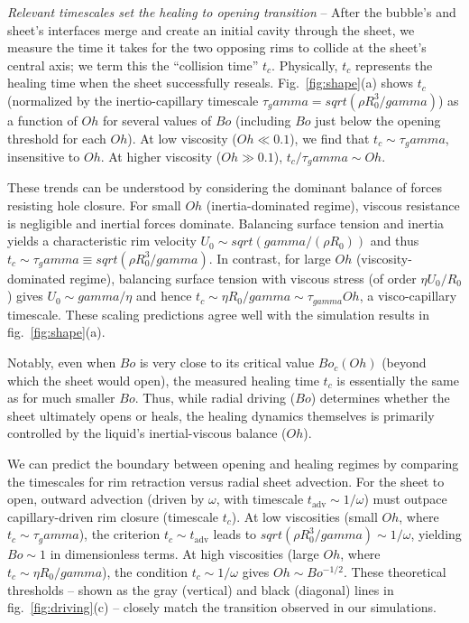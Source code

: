 \documentclass[reprint,amssymb,superscriptaddress,aps,prl,floatfix]{revtex4-2}
\def\gamma{gamma}%
\def\sqrt#1{sqrt(#1)}%
\begin{document}
{\it Relevant timescales set the healing to opening transition} -- 
After the bubble's and sheet's interfaces merge and create an initial cavity through the sheet, we
measure the time it takes for the two opposing rims to collide at the sheet's central
axis; we term this the ``collision time'' $t_c$. Physically, $t_c$ represents the healing
time when the sheet successfully reseals. Fig.~\ref{fig:shape}(a) shows $t_c$ (normalized
by the inertio-capillary timescale $\tau_\gamma = \sqrt{\rho R_0^3/\gamma}$) as a function
of $Oh$ for several values of $Bo$ (including $Bo$ just below the opening threshold for
each $Oh$). At low viscosity ($Oh \ll 0.1$), we find that $t_c \sim \tau_\gamma$,
insensitive to $Oh$. At higher viscosity ($Oh \gg 0.1$), $t_c/\tau_\gamma \sim Oh$.

These trends can be understood by considering the dominant balance of forces resisting
hole closure. For small $Oh$ (inertia-dominated regime), viscous resistance is negligible
and inertial forces dominate. Balancing surface tension and inertia yields a
characteristic rim velocity $U_0 \sim \sqrt{\gamma/(\rho R_0)}$ and thus $t_c \sim
\tau_\gamma \equiv \sqrt{\rho R_0^3/\gamma}$. In contrast, for large $Oh$
(viscosity-dominated regime), balancing surface tension with viscous stress (of order
$\eta U_0/R_0$) gives $U_0 \sim \gamma/\eta$ and hence $t_c \sim \eta R_0/\gamma \sim
\tau_{\gamma} Oh$, a visco-capillary timescale. These scaling predictions agree well with
the simulation results in fig.~\ref{fig:shape}(a).

Notably, even when $Bo$ is very close to its critical value $Bo_c(Oh)$ (beyond which the
sheet would open), the measured healing time $t_c$ is essentially the same as for much
smaller $Bo$. Thus, while radial driving ($Bo$) determines whether the sheet ultimately
opens or heals, the healing dynamics themselves is primarily controlled by the liquid's
inertial-viscous balance ($Oh$).

We can predict the boundary between opening and healing regimes by comparing the
timescales for rim retraction versus radial sheet advection. For the sheet to open,
outward advection (driven by $\omega$, with timescale $t_{\text{adv}} \sim 1/\omega$) must
outpace capillary-driven rim closure (timescale $t_c$). At low viscosities (small $Oh$,
where $t_c \sim \tau_\gamma$), the criterion $t_c \sim t_{\text{adv}}$ leads to
$\sqrt{\rho R_0^3/\gamma} \sim 1/\omega$, yielding $Bo \sim 1$ in dimensionless terms. At
high viscosities (large $Oh$, where $t_c \sim \eta R_0/\gamma$), the condition $t_c \sim
1/\omega$ gives $Oh \sim Bo^{-1/2}$. These theoretical thresholds -- shown as the gray
(vertical) and black (diagonal) lines in fig.~\ref{fig:driving}(c) -- closely match the
transition observed in our simulations.
\end{document}
